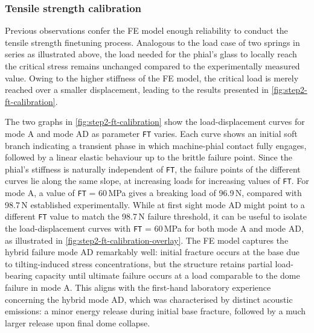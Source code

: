 \subsubsection{Tensile strength calibration} 
Previous observations confer the FE model enough reliability to conduct the tensile strength finetuning process. Analogous to the load case of two springs in series as illustrated above, the load needed for the phial's glass to locally reach the critical stress remains unchanged compared to the experimentally measured value. Owing to the higher stiffness of the FE model, the critical load is merely reached over a smaller displacement, leading to the results presented in \cref{fig:step2-ft-calibration}. 

The two graphs in \cref{fig:step2-ft-calibration} show the load-displacement curves for mode A and mode AD as parameter \texttt{FT} varies. Each curve shows an initial soft branch indicating a transient phase in which machine-phial contact fully engages, followed by a linear elastic behaviour up to the brittle failure point. Since the phial's stiffness is naturally independent of \texttt{FT}, the failure points of the different curves lie along the same slope, at increasing loads for increasing values of \texttt{FT}. For mode A, a value of \texttt{FT} = 60\,MPa gives a breaking load of 96.9\,N, compared with 98.7\,N established experimentally. While at first sight mode AD might point to a different \texttt{FT} value to match the 98.7\,N failure threshold, it can be useful to isolate the load-displacement curves with \texttt{FT} = 60\,MPa for both mode A and mode AD, as illustrated in \cref{fig:step2-ft-calibration-overlay}. The FE model captures the hybrid failure mode AD remarkably well: initial fracture occurs at the base due to tilting-induced stress concentrations, but the structure retains partial load-bearing capacity until ultimate failure occurs at a load comparable to the dome failure in mode A. This aligns with the first-hand laboratory experience concerning the hybrid mode AD, which was characterised by distinct acoustic emissions: a minor energy release during initial base fracture, followed by a much larger release upon final dome collapse. 

